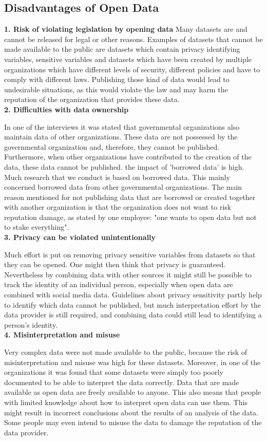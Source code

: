 \documentclass[a4paper, 11pt,twoside=true]{scrartcl}
\begin{document}
\subsection{Disadvantages of Open Data}
\textbf{1. Risk of violating legislation by opening data}
\quad Many datasets are and cannot be released for legal or other reasons. Examples of datasets that cannot be made available to the public are datasets which contain privacy identifying variables, sensitive variables and datasets which have been created by multiple organizations which have different levels of security, different policies and have to comply with different laws. Publishing those kind of data would lead to undesirable situations, as this would violate the law and may harm the reputation of the organization that provides these data. \\
\textbf{2. Difficulties with data ownership}

\quad In one of the interviews it was stated that governmental organizations also maintain data of other organizations. These data are not possessed by the governmental organization and, therefore, they cannot be published. Furthermore, when other organizations have contributed to the creation of the data, these data cannot be published. the impact of 'borrowed data’ is high. Much research that we conduct is based on borrowed data. This mainly concerned borrowed data from other governmental organizations. The main reason mentioned for not publishing data that are borrowed or created together with another organization is that the organization does not want to risk reputation damage, as stated by one employee: "one wants to open data but not to stake everything".\\
\textbf{3. Privacy can be violated unintentionally}

\quad Much effort is put on removing privacy sensitive variables from datasets so that they can be opened. One might then think that privacy is guaranteed. Nevertheless by combining data with other sources it might still be possible to track the identity of an individual person, especially when open data are combined with social media data. Guidelines about privacy sensitivity partly help to identify which data cannot be published, but much interpretation effort by the data provider is still required, and combining data could still lead to identifying a person’s identity. \\
\textbf{4. Misinterpretation and misuse}

\quad Very complex data were not made available to the public, because the risk of misinterpretation and misuse was high for these datasets. Moreover, in one of the organizations it was found that some datasets were simply too poorly documented to be able to interpret the data correctly. Data that are made available as open data are freely available to anyone. This also means that people with limited knowledge about how to interpret open data can use them. This might result in incorrect conclusions about the results of an analysis of the data. Some people may even intend to misuse the data to damage the reputation of the data provider. 
\end{document}
